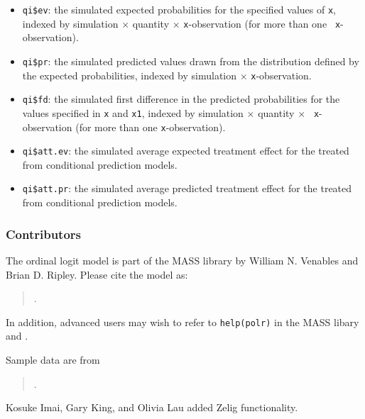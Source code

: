 \begin{itemize}
   \begin{itemize}
   \item {\tt qi\$ev}: the simulated expected probabilities for the
     specified values of {\tt x}, indexed by simulation $\times$
     quantity $\times$ {\tt x}-observation (for more than one {\tt
       x}-observation).
   \item {\tt qi\$pr}: the simulated predicted values drawn from the
     distribution defined by the expected probabilities, indexed by
     simulation $\times$ {\tt x}-observation.
   \item {\tt qi\$fd}: the simulated first difference in the predicted
     probabilities for the values specified in {\tt x} and {\tt x1},
     indexed by simulation $\times$ quantity $\times$ {\tt
       x}-observation (for more than one {\tt x}-observation).
   \item {\tt qi\$att.ev}: the simulated average expected treatment
     effect for the treated from conditional prediction models.  
   \item {\tt qi\$att.pr}: the simulated average predicted treatment
     effect for the treated from conditional prediction models.  
   \end{itemize}
\end{itemize}

\subsubsection{Contributors}

The ordinal logit model is part of the MASS library by William N.
Venables and Brian D. Ripley.  Please cite the model as:
\begin{verse}
.
\end{verse}

In addition, advanced users may wish to refer to
{\tt help(polr)} in the MASS libary and \cite{McCNel89}.

Sample data are from 
\begin{verse}
.  
\end{verse}

Kosuke Imai, Gary King, and Olivia Lau added Zelig functionality.  







